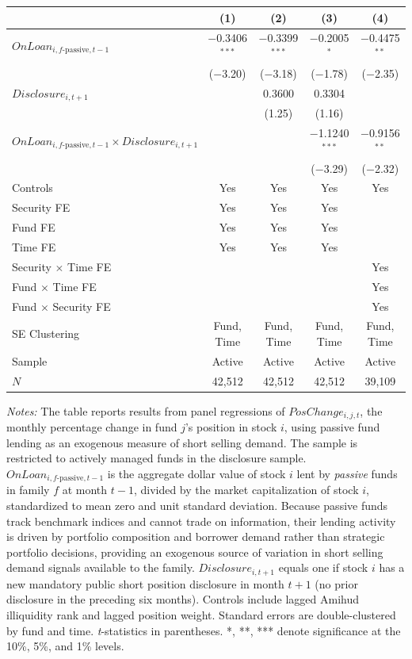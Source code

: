 {\small
\begin{tabular}{l*{4}{c}}
\toprule
 & (1) & (2) & (3) & (4) \\
\midrule
$\mathit{OnLoan}_{i,f\text{-passive},t-1}$ & $-$0.3406$^{***}$ & $-$0.3399$^{***}$ & $-$0.2005$^{*}$ & $-$0.4475$^{**}$ \\
 & ($-$3.20) & ($-$3.18) & ($-$1.78) & ($-$2.35) \\[0.3em]
$\mathit{Disclosure}_{i,t+1}$ & & 0.3600 & 0.3304 & \\
 & & (1.25) & (1.16) & \\[0.3em]
$\mathit{OnLoan}_{i,f\text{-passive},t-1} \times \mathit{Disclosure}_{i,t+1}$ & & & $-$1.1240$^{***}$ & $-$0.9156$^{**}$ \\
 & & & ($-$3.29) & ($-$2.32) \\
\midrule
Controls & Yes & Yes & Yes & Yes \\
\midrule
Security FE & Yes & Yes & Yes & \\
Fund FE & Yes & Yes & Yes & \\
Time FE & Yes & Yes & Yes & \\
Security $\times$ Time FE & & & & Yes \\
Fund $\times$ Time FE & & & & Yes \\
Fund $\times$ Security FE & & & & Yes \\
\midrule
SE Clustering & Fund, Time & Fund, Time & Fund, Time & Fund, Time \\
Sample & Active & Active & Active & Active \\
$N$ & 42,512 & 42,512 & 42,512 & 39,109 \\
\bottomrule
\end{tabular}
}
\par\smallskip
{\footnotesize
\textit{Notes:} The table reports results from panel regressions of $PosChange_{i,j,t}$, the monthly percentage change in fund $j$'s position in stock $i$, using passive fund lending as an exogenous measure of short selling demand. The sample is restricted to actively managed funds in the disclosure sample. $\mathit{OnLoan}_{i,f\text{-passive},t-1}$ is the aggregate dollar value of stock $i$ lent by \textit{passive} funds in family $f$ at month $t-1$, divided by the market capitalization of stock $i$, standardized to mean zero and unit standard deviation. Because passive funds track benchmark indices and cannot trade on information, their lending activity is driven by portfolio composition and borrower demand rather than strategic portfolio decisions, providing an exogenous source of variation in short selling demand signals available to the family. $\mathit{Disclosure}_{i,t+1}$ equals one if stock $i$ has a new mandatory public short position disclosure in month $t+1$ (no prior disclosure in the preceding six months). Controls include lagged Amihud illiquidity rank and lagged position weight. Standard errors are double-clustered by fund and time. \textit{t}-statistics in parentheses. *, **, *** denote significance at the 10\%, 5\%, and 1\% levels.
}

